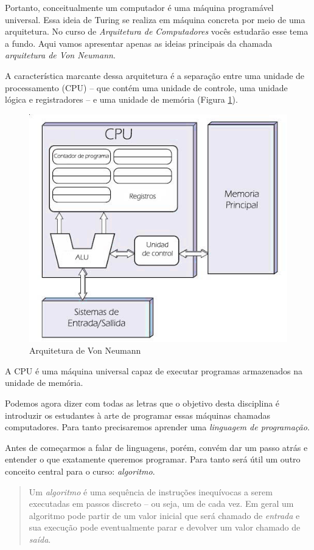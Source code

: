 Portanto, conceitualmente um computador é uma máquina programável universal.
Essa ideia de Turing se realiza em máquina concreta por meio de uma arquitetura.
No curso de {\em Arquitetura de Computadores} vocês estudarão esse tema a fundo.
Aqui vamos apresentar apenas as ideias principais da chamada {\em arquitetura de Von Neumann}.

A característica marcante dessa arquitetura é a separação entre uma unidade de processamento (CPU) -- que contém uma unidade de controle, uma unidade lógica e registradores -- e uma unidade de memória (Figura \ref{fig:von-neumann}).

\begin{figure}[htbp]
  \centering
  \includegraphics[width=.5\textwidth]{imagens/von-neumann.jpg}
  \caption{Arquitetura de Von Neumann}
  \label{fig:von-neumann}
\end{figure}

A CPU é uma máquina universal capaz de executar programas armazenados na unidade de memória.

Podemos agora dizer com todas as letras que o objetivo desta disciplina é introduzir os estudantes à arte de programar essas máquinas chamadas computadores.
Para tanto precisaremos aprender uma {\em linguagem de programação}.

Antes de começarmos a falar de linguagens, porém, convém dar um passo atrás e entender o que exatamente queremos programar.
Para tanto será útil um outro conceito central para o curso: {\em algoritmo}.

\begin{quote}
  Um {\em algoritmo} é uma sequência de instruções inequívocas a serem executadas em passos discreto -- ou seja, um de cada vez.
  Em geral um algoritmo pode partir de um valor inicial que será chamado de {\em entrada} e sua execução pode eventualmente parar e devolver um valor chamado de {\em saída}.
\end{quote}

